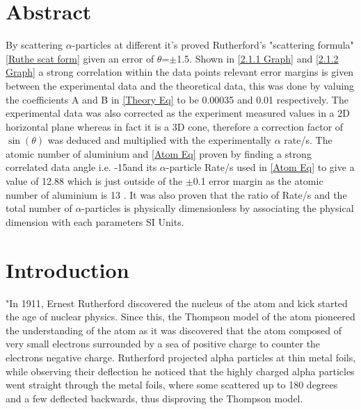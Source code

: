 \documentclass[12pt]{article}
\begin{document}
\newpage
\begin{titlepage}
\begin{tableofcontents}
\end{tableofcontents}
\end{titlepage}
\newpage
\section{Abstract}
\label{Abstract Section}

By scattering $\alpha$-particles at different it’s proved Rutherford’s "scattering formula" \cref{Ruthe scat form} given an error of $\theta$=$\pm$1.5\textdegree. Shown in \cref{2.1.1 Graph} and \cref{2.1.2 Graph} a strong correlation within the data points relevant error margins is given between the experimental data and the theoretical data, this was done by valuing the coefficients A and B in \cref{Theory Eq} to be 0.00035 and 0.01 respectively. The experimental data was also corrected as the experiment measured values in a 2D horizontal plane whereas in fact it is a 3D cone, therefore a correction factor of $\sin(\theta)$ was deduced and multiplied with the experimentally $\alpha$ rate/s. The atomic number of aluminium and \cref{Atom Eq} proven by finding a strong correlated data angle i.e. -15\textdegree and its $\alpha$-particle Rate/s used in \cref{Atom Eq} to give a value of 12.88 which is just outside of the $\pm$0.1 error margin as the atomic number of aluminium is 13 \cite{CRC}. It was also proven that the ratio of Rate/s and the total number of $\alpha$-particles is physically dimensionless by associating the physical dimension with each parameters SI Units.

\section{Introduction}
\label{Introduction Section}

"In 1911, Ernest Rutherford discovered the nucleus of the atom and kick started the age of nuclear physics. Since this, the Thompson model of the atom pioneered the understanding of the atom as it was discovered that the atom composed of very small electrons surrounded by a sea of positive charge to counter the electrons negative charge. Rutherford projected alpha particles at thin metal foils, while observing their deflection he noticed that the highly charged alpha particles went straight through the metal foils, where some scattered up to 180 degrees and a few deflected backwards, thus disproving the Thompson model. \cite{Exp.6-2019} \cite{Exp.6-Lab_book} \\
\end{document}
